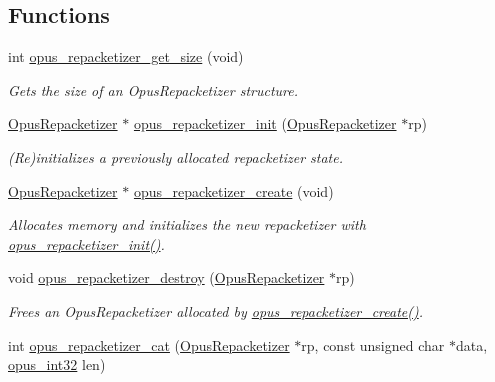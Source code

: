 \subsection*{Functions}
\begin{DoxyCompactItemize}
\item 
int \hyperlink{group__opus__repacketizer_ga35c8fc05764748d187c62fc50e812d06}{opus\+\_\+repacketizer\+\_\+get\+\_\+size} (void)
\begin{DoxyCompactList}\small\item\em Gets the size of an {\ttfamily Opus\+Repacketizer} structure. \end{DoxyCompactList}\item 
\hyperlink{group__opus__repacketizer_ga1f85070a64bcbf5bf24f5ccb80323e7b}{Opus\+Repacketizer} $\ast$ \hyperlink{group__opus__repacketizer_gab42ff7c3f8a49ff5029fcf60f3b853f0}{opus\+\_\+repacketizer\+\_\+init} (\hyperlink{group__opus__repacketizer_ga1f85070a64bcbf5bf24f5ccb80323e7b}{Opus\+Repacketizer} $\ast$rp)
\begin{DoxyCompactList}\small\item\em (Re)initializes a previously allocated repacketizer state. \end{DoxyCompactList}\item 
\hyperlink{group__opus__repacketizer_ga1f85070a64bcbf5bf24f5ccb80323e7b}{Opus\+Repacketizer} $\ast$ \hyperlink{group__opus__repacketizer_ga6f8813666ef851550ecf8658a731ff7d}{opus\+\_\+repacketizer\+\_\+create} (void)
\begin{DoxyCompactList}\small\item\em Allocates memory and initializes the new repacketizer with \hyperlink{group__opus__repacketizer_gab42ff7c3f8a49ff5029fcf60f3b853f0}{opus\+\_\+repacketizer\+\_\+init()}. \end{DoxyCompactList}\item 
void \hyperlink{group__opus__repacketizer_gadb08b25d2a29a559c35774cfe2a1b886}{opus\+\_\+repacketizer\+\_\+destroy} (\hyperlink{group__opus__repacketizer_ga1f85070a64bcbf5bf24f5ccb80323e7b}{Opus\+Repacketizer} $\ast$rp)
\begin{DoxyCompactList}\small\item\em Frees an {\ttfamily Opus\+Repacketizer} allocated by \hyperlink{group__opus__repacketizer_ga6f8813666ef851550ecf8658a731ff7d}{opus\+\_\+repacketizer\+\_\+create()}. \end{DoxyCompactList}\item 
int \hyperlink{group__opus__repacketizer_ga2840dd56bfa37f8c6874355b9ce8fb46}{opus\+\_\+repacketizer\+\_\+cat} (\hyperlink{group__opus__repacketizer_ga1f85070a64bcbf5bf24f5ccb80323e7b}{Opus\+Repacketizer} $\ast$rp, const unsigned char $\ast$data, \hyperlink{opus__types_8h_aa4d309d6f80b99dbabebc8f98879ab9a}{opus\+\_\+int32} len)

\end{DoxyCompactItemize}
